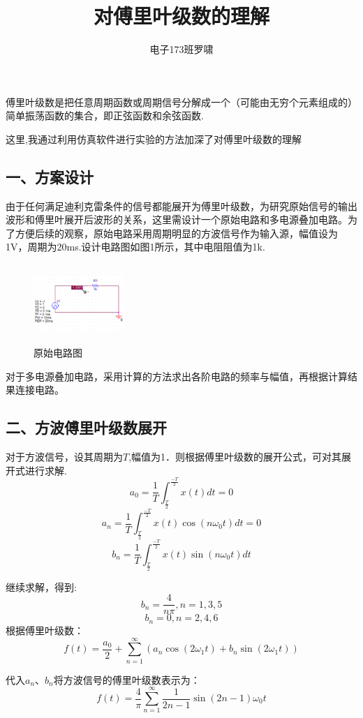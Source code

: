 \documentclass[]{article}
\title{对傅里叶级数的理解}
\author{电子173班\quad 罗啸}
\begin{document}
\maketitle
{}
傅里叶级数是把任意周期函数或周期信号分解成一个（可能由无穷个元素组成的）简单振荡函数的集合，即正弦函数和余弦函数.

这里,我通过利用仿真软件进行实验的方法加深了对傅里叶级数的理解
\subsection*{一、方案设计}
由于任何满足迪利克雷条件的信号都能展开为傅里叶级数，为研究原始信号的输出波形和傅里叶展开后波形的关系，这里需设计一个原始电路和多电源叠加电路。为了方便后续的观察，原始电路采用周期明显的方波信号作为输入源，幅值设为1V，周期为20ms.设计电路图如图1所示，其中电阻阻值为1k.
\begin{figure}[htbp]
	\centering
	\includegraphics[height=3.0cm,width=3.5cm]{pics/0.png}%
	\caption{原始电路图}
\end{figure}

对于多电源叠加电路，采用计算的方法求出各阶电路的频率与幅值，再根据计算结果连接电路。

\subsection*{二、方波傅里叶级数展开}
对于方波信号，设其周期为$T$,幅值为1．则根据傅里叶级数的展开公式，可对其展开式进行求解.
$$a_{0}=\frac{1}{T}\int_{\frac{T}{2}}^{\frac{-T}{2}}x(t)dt=0$$
$$a_{n}=\frac{1}{T}\int_{\frac{T}{2}}^{\frac{-T}{2}}x(t)\cos{(n\omega_0t)}dt=0$$
$$b_{n}=\frac{1}{T}\int_{\frac{T}{2}}^{\frac{-T}{2}}x(t)\sin{(n\omega_0t)}dt$$

继续求解，得到:
$$b_{n}=\frac{4}{n\pi},n=1,3,5$$
$$b_{n}=0,n=2,4,6$$
根据傅里叶级数：$$f(t)=\frac{a_{0}}{2}+\sum_{n=1}^{\infty}{(a_{n}\cos{(2\omega_{1}t)}+b_{n}\sin{(2\omega_{1}t)})}$$

代入$a_n、b_n$将方波信号的傅里叶级数表示为：
$$f(t)=\frac{4}{\pi}\sum_{n=1}^{\infty}{\frac{1}{2n-1}\sin{(2n-1)\omega_0t}}$$
\end{document}
